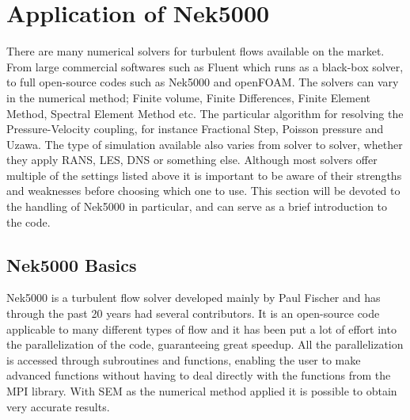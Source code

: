 
\chapter{Application of Nek5000} %

\label{nek} %




There are many numerical solvers for turbulent flows available on the market.
From large commercial softwares such as Fluent which runs as a 
black-box solver, to full open-source codes such as Nek5000 and openFOAM. 
The solvers can vary in the numerical method; Finite volume, Finite Differences, 
Finite Element Method, Spectral Element Method etc. The particular algorithm 
for resolving the Pressure-Velocity coupling, for instance Fractional Step, Poisson pressure and 
Uzawa. The type of simulation available also varies from solver to solver, whether
they apply RANS, LES, DNS or something else. Although most solvers offer multiple of the settings
listed above it is important to be aware of their strengths and weaknesses before choosing which 
one to use. This section will be devoted to the handling of Nek5000 in particular, and can serve
as a brief introduction to the code.

\section{Nek5000 Basics}

Nek5000 is a turbulent flow solver developed mainly by Paul Fischer
and has through the past 20 years had several contributors. 
It is an open-source code applicable to many different types of flow 
and it has been put a lot of effort into the parallelization of the code, 
guaranteeing great speedup. All the parallelization is accessed through subroutines
and functions, enabling the user to make advanced functions without having to 
deal directly with the functions from the MPI library.
With SEM as the numerical method applied it is possible to obtain very accurate results.  

